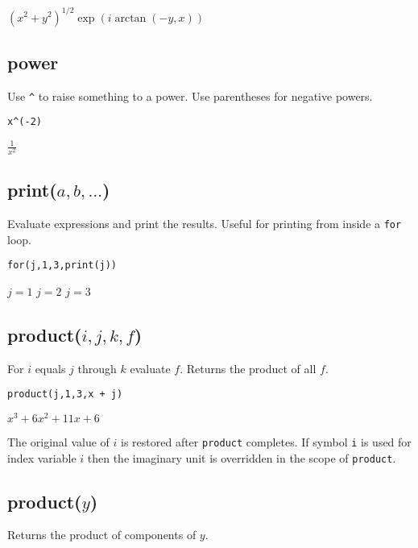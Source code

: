 \documentclass[12pt]{article}
\begin{document}
\noindent
$\displaystyle (x^2+y^2)^{1/2}\exp(i\arctan(-y,x))$

\subsection*{power}

Use \verb$^$ to raise something to a power.
Use parentheses for negative powers.

{\color{blue}
\begin{verbatim}
x^(-2)
\end{verbatim}
}

\noindent
$\displaystyle \frac{1}{x^2}$

\subsection*{print($a,b,\ldots$)}

Evaluate expressions and print the results.
Useful for printing from inside a {\tt for} loop.

{\color{blue}
\begin{verbatim}
for(j,1,3,print(j))
\end{verbatim}
}

\noindent
$j=1$\newline
$j=2$\newline
$j=3$

\subsection*{product($i,j,k,f$)}

For $i$ equals $j$ through $k$ evaluate $f$.
Returns the product of all $f$.

{\color{blue}
\begin{verbatim}
product(j,1,3,x + j)
\end{verbatim}
}

\noindent
$\displaystyle x^3+6x^2+11x+6$

\bigskip
\noindent
The original value of $i$ is restored after {\tt product} completes.
If symbol {\tt i} is used for index variable $i$
then the imaginary unit is overridden in the scope of {\tt product}.

\subsection*{product($y$)}

Returns the product of components of $y$.
\end{document}
